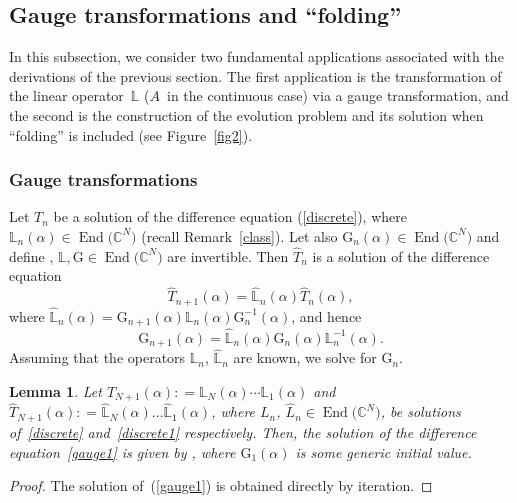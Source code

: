 \documentclass[10pt,a4paper]{amsart}
\numberwithin{equation}{section}
\newcounter{diff_order}
\newcounter{diff_power}
\newtheorem{lem}[thm]{Lemma}
\theoremstyle{definition}
\DeclareMathOperator{\EEnd}{End}%
\def\mathcal#1{#1}%
\begin{document}
\subsection{Gauge {transformations} and ``folding''}\label{section3.2}

 In this subsection, we consider two fundamental applications
associated with the derivations of the previous section.
The first application is the transformation of the linear operator~${\mathbb L}$ ($A$~in the continuous case) via a gauge transformation,
and the second is the construction of the evolution problem and its solution when ``folding'' is included (see Figure~\ref{fig2}).

\subsubsection{Gauge transformations} Let $T_n$ be a solution of the difference equation
(\ref{discrete}), where ${\mathbb L}_n(\alpha) \in \EEnd\bigl({\mathbb C}^{\mathcal N}\bigr)$ (recall Remark~\ref{class}). Let also
${\mathrm G}_n(\alpha) \in \EEnd\bigl({\mathbb C}^{\mathcal N}\bigr)$ and define , ${\mathbb L}, {\mathrm G} \in \EEnd\bigl({\mathbb C}^{\mathcal N}\bigr)$ are invertible.
Then
$\hat T_n$ is a solution of the difference equation
\begin{equation}
\hat T_{n+1}(\alpha) = \hat {\mathbb L}_n(\alpha) \hat T_n(\alpha), \label{discrete1}
\end{equation}
 where
$\hat {\mathbb L}_n(\alpha) = {\mathrm G}_{n+1}(\alpha) {\mathbb L}_n(\alpha) {\mathrm G}_{n}^{-1}(\alpha)$,
and hence
\begin{equation}
{\mathrm G}_{n+1}(\alpha) = \hat {\mathbb L}_n(\alpha) {\mathrm G}_n(\alpha) {\mathbb L}^{-1}_n(\alpha).\label{gauge1}
\end{equation}
 Assuming that the operators ${\mathbb L_n}$, $\hat {\mathbb L}_n$ are known, we solve for ${\mathrm G}_n$.

\begin{lem}%
Let $T_{N+1} (\alpha): = {\mathbb L}_{N}(\alpha)\cdots {\mathbb L}_{1}(\alpha)$ and $\hat T_{N+1} (\alpha): = \hat {\mathbb L}_{N}(\alpha)\dots \hat {\mathbb L}_{1}(\alpha)$, where $L_n$, $\hat L_n \in\EEnd\bigl({\mathbb C}^{\mathcal N}\bigr)$, be solutions of~\eqref{discrete} and~\eqref{discrete1} respectively. Then, the solution of the difference equation~\eqref{gauge1} is given by , where ${\mathrm G}_1(\alpha)$ is some generic initial value.
\end{lem}
\begin{proof} The solution of~(\ref{gauge1}) is obtained directly by iteration.
\end{proof}
\end{document}
